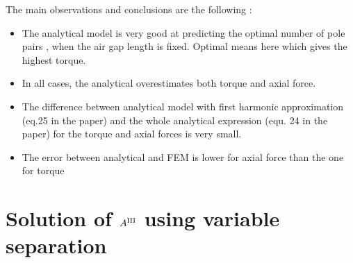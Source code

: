 The main observations and conclusions are the following : 






\begin{itemize}
    \item The analytical model is very good at predicting the optimal number of pole pairs , when the air gap length is fixed. Optimal means here which gives the highest torque.
    \item In all cases, the analytical overestimates both torque and axial force.
    \item The difference between analytical model with first harmonic approximation (eq.25 in the paper) and the whole analytical expression (equ. 24 in the paper) for the torque and axial forces is very small.
    \item The error between analytical and FEM is lower for axial force than the one for torque
\end{itemize}





\appendix

\section{Solution of \texorpdfstring{$A^{\rm III}$}{A} using variable separation}
\label{apdxA}


